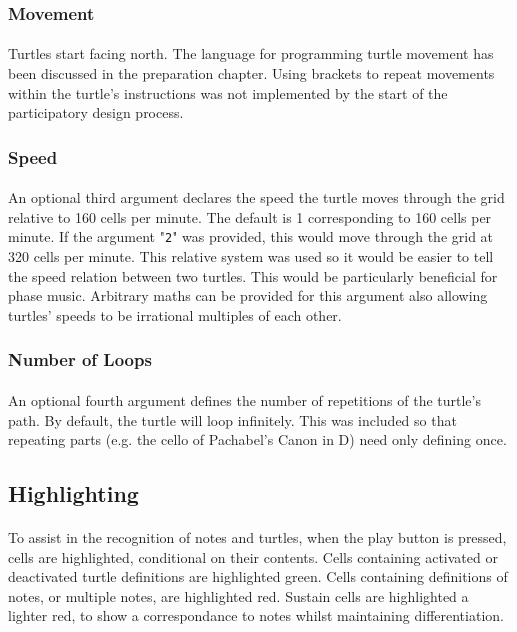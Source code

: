 \subsubsection{Movement}

\paragraph{} Turtles start facing north. The language for programming turtle movement has been discussed in the preparation chapter. Using brackets to repeat movements within the turtle's instructions was not implemented by the start of the participatory design process.

\subsubsection{Speed}

\paragraph{} An optional third argument declares the speed the turtle moves through the grid relative to 160 cells per minute. The default is 1 corresponding to 160 cells per minute. If the argument "\texttt{2}" was provided, this would move through the grid at 320 cells per minute. This relative system was used so it would be easier to tell the speed relation between two turtles. This would be particularly beneficial for phase music. Arbitrary maths can be provided for this argument also allowing turtles' speeds to be irrational multiples of each other.

\subsubsection{Number of Loops}

\paragraph{} An optional fourth argument defines the number of repetitions of the turtle's path. By default, the turtle will loop infinitely. This was included so that repeating parts (e.g. the cello  of Pachabel's Canon in D) need only defining once.

\subsection{Highlighting}

\paragraph{} To assist in the recognition of notes and turtles, when the play button is pressed, cells are highlighted, conditional on their contents. Cells containing activated or deactivated turtle definitions are highlighted green. Cells containing definitions of notes, or multiple notes, are highlighted red. Sustain cells are highlighted a lighter red, to show a correspondance to notes whilst maintaining differentiation.

